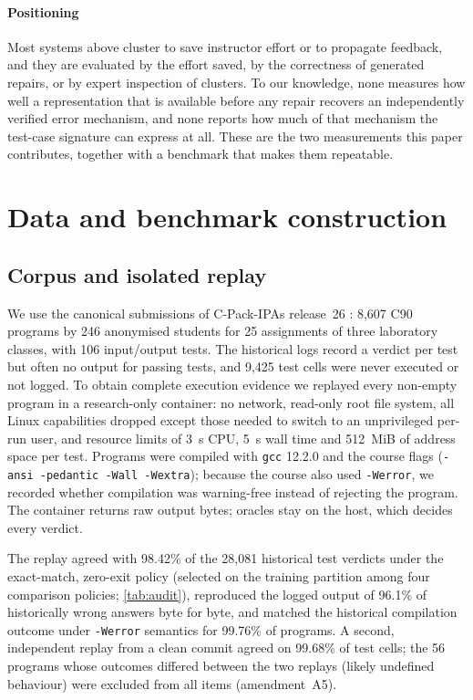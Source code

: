\documentclass[a4paper,preprint,12pt,authoryear]{elsarticle}
\begin{document}
\paragraph{Positioning}
Most systems above cluster to save instructor effort or to propagate feedback, and they are evaluated by the effort saved, by the correctness of generated repairs, or by expert inspection of clusters. To our knowledge, none measures how well a representation that is available before any repair recovers an independently verified error mechanism, and none reports how much of that mechanism the test-case signature can express at all. These are the two measurements this paper contributes, together with a benchmark that makes them repeatable.

\section{Data and benchmark construction}\label{sec:data}

\subsection{Corpus and isolated replay}\label{sec:replay}
We use the canonical submissions of C-Pack-IPAs release~26 \citep{orvalho2024cpack}: 8,607 C90 programs by 246 anonymised students for 25 assignments of three laboratory classes, with 106 input/output tests. The historical logs record a verdict per test but often no output for passing tests, and 9,425 test cells were never executed or not logged. To obtain complete execution evidence we replayed every non-empty program in a research-only container: no network, read-only root file system, all Linux capabilities dropped except those needed to switch to an unprivileged per-run user, and resource limits of 3~s CPU, 5~s wall time and 512~MiB of address space per test. Programs were compiled with \texttt{gcc} 12.2.0 and the course flags (\texttt{-ansi -pedantic -Wall -Wextra}); because the course also used \texttt{-Werror}, we recorded whether compilation was warning-free instead of rejecting the program. The container returns raw output bytes; oracles stay on the host, which decides every verdict.

The replay agreed with 98.42\% of the 28,081 historical test verdicts under the exact-match, zero-exit policy (selected on the training partition among four comparison policies; \cref{tab:audit}), reproduced the logged output of 96.1\% of historically wrong answers byte for byte, and matched the historical compilation outcome under \texttt{-Werror} semantics for 99.76\% of programs. A second, independent replay from a clean commit agreed on 99.68\% of test cells; the 56 programs whose outcomes differed between the two replays (likely undefined behaviour) were excluded from all items (amendment~A5).
\end{document}
